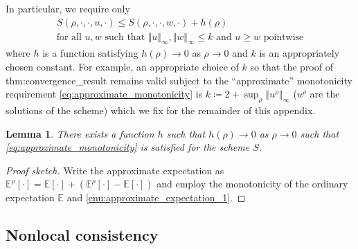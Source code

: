 \documentclass[12pt]{article}
\newcounter{dummy}
\newtheorem{lemma}[dummy]{Lemma}
\begin{document}
In particular, we require only
\begin{gather}
S(\rho,\cdot,\cdot,u,\cdot){\leqslant} S(\rho,\cdot,\cdot,w,\cdot)+h(\rho)\nonumber \\
\text{for all }u,w\text{ such that }\Vert u\Vert_{\infty},\Vert w\Vert_{\infty}{\leqslant} k\text{ and }u{\geqslant} w\text{ pointwise}\label{eq:approximate_monotonicity}
\end{gather}
where $h$ is a function satisfying $h(\rho)\rightarrow0$ as $\rho\rightarrow0$
and $k$ is an appropriately chosen constant. For example, an appropriate
choice of $k$ so that the proof of {\prettyref}{thm:convergence_result}
remains valid subject to the ``approximate'' monotonicity requirement
\eqref{eq:approximate_monotonicity} is $k\coloneqq2+\sup_{\rho}\Vert u^{\rho}\Vert_{\infty}$
($u^{\rho}$ are the solutions of the scheme) which we fix for the
remainder of this appendix.
\begin{lemma}
There exists a function $h$ such that $h(\rho)\rightarrow0$ as $\rho\rightarrow0$
such that \eqref{eq:approximate_monotonicity} is satisfied for the
scheme $S$.
\end{lemma}
\begin{proof}[Proof sketch]
Write the approximate expectation as $\mathbb{E}^{\rho}[\cdot]=\mathbb{E}[\cdot]+(\mathbb{E}^{\rho}[\cdot]-\mathbb{E}[\cdot])$
and employ the monotonicity of the ordinary expectation $\mathbb{E}$
and \ref{enu:approximate_expectation_1}.
\end{proof}

\subsection{Nonlocal consistency}
\end{document}
